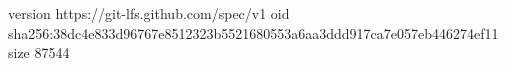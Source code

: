 version https://git-lfs.github.com/spec/v1
oid sha256:38dc4e833d96767e8512323b5521680553a6aa3ddd917ca7e057eb446274ef11
size 87544
